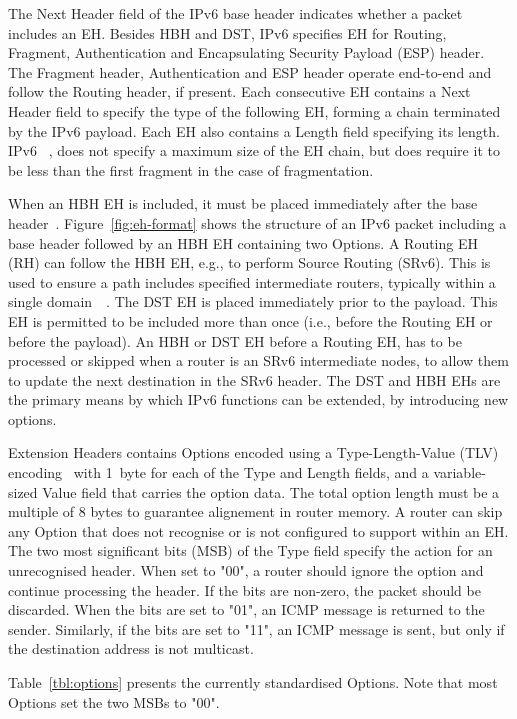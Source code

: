 \documentclass[conference]{IEEEtran}
\begin{document}
The Next Header field of the IPv6 base header indicates whether a packet
includes an EH.  Besides HBH and DST, IPv6 specifies EH for Routing, Fragment,
Authentication and Encapsulating Security Payload (ESP) header.  The Fragment
header, Authentication and ESP header operate end-to-end and follow the Routing
header, if present.  Each consecutive EH contains a Next Header field to
specify the type of the following EH, forming a chain terminated by the IPv6
payload. Each EH also contains a Length field specifying its length.  IPv6
~\cite{RFC8200}, does not specify a maximum size of the EH chain, but does
require it to be less than the first fragment in the case of fragmentation. 

When an HBH EH is included, it must be placed immediately after the base
header~\cite{RFC8200}.  Figure~\ref{fig:eh-format} shows the structure of an
IPv6 packet including a base header followed by an HBH EH containing two
Options.  A Routing EH (RH) can follow the HBH EH, e.g., to perform Source
Routing (SRv6). This is used  to ensure a path includes specified intermediate
routers, typically within a single domain~\cite{srv6}~\cite{srperf}. The DST EH
is placed immediately prior to the payload. This EH is permitted to be included
more than once (i.e.,  before the Routing EH or before the payload).  An HBH or
DST EH  before a Routing EH, has to be processed or skipped when a router is an
SRv6 intermediate nodes, to allow them to update the next destination in the
SRv6 header.  The DST and HBH EHs are the primary means by which IPv6 functions
can be extended, by introducing new options. 

Extension Headers contains Options encoded using a Type-Length-Value (TLV)
encoding~\cite{RFC8200} with 1~byte for each of the Type and Length fields, and
a variable-sized Value field that carries the option data. The total option
length must be a multiple of 8 bytes to guarantee alignement in router memory.
A router can skip any Option that does not recognise or is not configured to
support within an EH.  The two most significant bits (MSB) of the Type field specify
the action for an unrecognised header.  When set to "00", a router should
ignore the option and continue processing the header.  If the bits are
non-zero, the packet should be discarded.  When the bits are set to "01", an
ICMP message is returned to the sender. Similarly, if the bits are set to "11",
an ICMP message is sent, but only if the destination address is not multicast.

Table~\ref{tbl:options} presents the currently standardised Options.  Note that
most Options set the two MSBs to "00".
\end{document}
